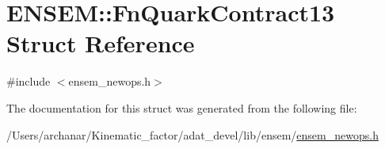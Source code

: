 \hypertarget{structENSEM_1_1FnQuarkContract13}{}\section{E\+N\+S\+EM\+:\+:Fn\+Quark\+Contract13 Struct Reference}
\label{structENSEM_1_1FnQuarkContract13}


{\ttfamily \#include $<$ensem\+\_\+newops.\+h$>$}



The documentation for this struct was generated from the following file\+:\begin{DoxyCompactItemize}
\item 
/\+Users/archanar/\+Kinematic\+\_\+factor/adat\+\_\+devel/lib/ensem/\mbox{\hyperlink{lib_2ensem_2ensem__newops_8h}{ensem\+\_\+newops.\+h}}\end{DoxyCompactItemize}
